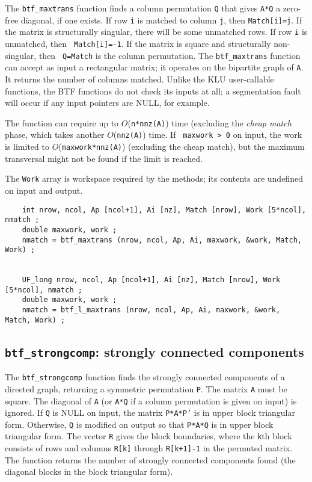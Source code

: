 \documentclass[11pt]{article}
\begin{document}
The {\tt btf\_maxtrans} function finds a column permutation {\tt Q} that gives
{\tt A*Q} a zero-free diagonal, if one exists.  If row {\tt i} is matched to
column {\tt j}, then {\tt Match[i]=j}.  If the matrix is structurally singular,
there will be some unmatched rows.  If row {\tt i} is unmatched, then {\tt
Match[i]=-1}.  If the matrix is square and structurally non-singular, then {\tt
Q=Match} is the column permutation.  The {\tt btf\_maxtrans} function can
accept as input a rectangular matrix; it operates on the bipartite graph of
{\tt A}.  It returns the number of columns matched.  Unlike the KLU
user-callable functions, the BTF functions do not check its inputs at all; a
segmentation fault will occur if any input pointers are NULL, for example.

The function can require up to $O$({\tt n*nnz(A)}) time (excluding the {\em
cheap match} phase, which takes another $O$({\tt nnz(A)}) time.  If {\tt
maxwork > 0} on input, the work is limited to $O$({\tt maxwork*nnz(A)})
(excluding the cheap match), but the maximum transversal might not be found if
the limit is reached.

The {\tt Work} array is workspace required by the methods; its contents
are undefined on input and output.

{\footnotesize
\begin{verbatim}
    int nrow, ncol, Ap [ncol+1], Ai [nz], Match [nrow], Work [5*ncol], nmatch ;
    double maxwork, work ;
    nmatch = btf_maxtrans (nrow, ncol, Ap, Ai, maxwork, &work, Match, Work) ;


    UF_long nrow, ncol, Ap [ncol+1], Ai [nz], Match [nrow], Work [5*ncol], nmatch ;
    double maxwork, work ;
    nmatch = btf_l_maxtrans (nrow, ncol, Ap, Ai, maxwork, &work, Match, Work) ;
\end{verbatim}
}

\subsection{{\tt btf\_strongcomp}: strongly connected components}

The {\tt btf\_strongcomp} function finds the strongly connected components of a
directed graph, returning a symmetric permutation {\tt P}.  The matrix {\tt A}
must be square.  The diagonal of {\tt A} (or {\tt A*Q} if a column permutation
is given on input) is ignored.  If {\tt Q} is NULL on input, the matrix
{\tt P*A*P'} is in upper block triangular form.  Otherwise, {\tt Q} is modified
on output so that {\tt P*A*Q} is in upper block triangular form.  The vector
{\tt R} gives the block boundaries, where the {\tt k}th block consists of
rows and columns {\tt R[k]} through {\tt R[k+1]-1} in the permuted matrix.
The function returns the number of strongly connected components found
(the diagonal blocks in the block triangular form).
\end{document}
